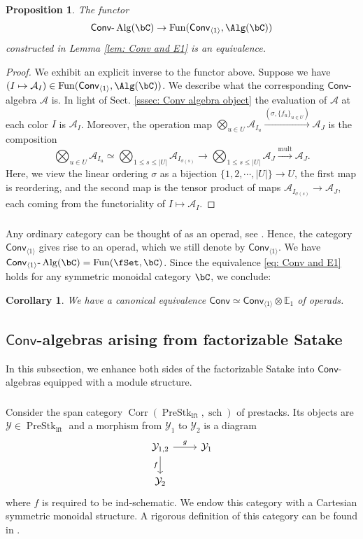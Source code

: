 \documentclass[10pt]{amsart}
\newcommand{\sssec}{\subsubsection}
\newtheorem{prop}[subsubsection]{Proposition}
\newtheorem{cor}[subsubsection]{Corollary}
\theoremstyle{remark}
\newcommand{\E}{\mathbb{E}}
\newcommand{\on}{\operatorname}
\newcommand{\cA}{\mathcal{A}}
\newcommand{\cY}{\mathcal{Y}}
\newcommand{\lAlg}{\text{-}\on{Alg}}
\newcommand{\PreStklft}{\on{PreStk}_{\on{lft}}}
\newcommand{\Fun}{\on{Fun}}
\newcommand{\Conv}{\mathsf{Conv}}
\newcommand{\Corr}{\on{Corr}}
\begin{document}
\begin{prop}
    The functor 
    \begin{equation}\label{eq: Conv and E1}
        \Conv\lAlg(\bC)\rightarrow \Fun(\Conv_{\langle 1\rangle},\Alg(\bC))
    \end{equation}
    constructed in Lemma \ref{lem: Conv and E1} is an equivalence.
\end{prop}
\begin{proof}
    We exhibit an explicit inverse to the functor above. Suppose we have $(I\mapsto\cA_I)\in \Fun(\Conv_{\langle 1\rangle},\Alg(\bC))$. We describe what the corresponding $\Conv$-algebra $\cA$ is. In light of Sect. \ref{sssec: Conv algebra object} the evaluation of $\cA$ at each color $I$ is $\cA_I$. Moreover, the operation map $\bigotimes_{u\in U}\cA_{I_u}\xrightarrow{(\sigma,\{f_u\}_{u\in U})}\cA_J$ is the composition
    \[\bigotimes_{u\in U}\cA_{I_u}\simeq \bigotimes_{1\le s\le |U|}\cA_{I_{\sigma(s)}}\rightarrow \bigotimes_{1\le s\le |U|}\cA_{J}\xrightarrow{\on{mult}}\cA_J.\]
    Here, we view the linear ordering $\sigma$ as a bijection $\{1,2,\cdots,|U|\}\rightarrow U$, the first map is reordering, and the second map is the tensor product of maps $\cA_{I_{\sigma(s)}}\rightarrow \cA_J$, each coming from the functoriality of $I\mapsto \cA_I$.
\end{proof}

\sssec{}
Any ordinary category can be thought of as an operad, see \cite[Remark 2.1.1.4]{HA}. Hence, the category $\Conv_{\langle 1\rangle}$ gives rise to an operad, which we still denote by $\Conv_{\langle 1\rangle}$. We have $\Conv_{\langle 1\rangle}\lAlg(\bC)=\Fun(\fSet,\bC)$. Since the equivalence \eqref{eq: Conv and E1} holds for any symmetric monoidal category $\bC$, we conclude:

\begin{cor}
    We have a canonical equivalence $\Conv\simeq \Conv_{\langle 1\rangle}\otimes \E_1$ of operads.
\end{cor}

\subsection{$\Conv$-algebras arising from factorizable Satake}\label{ssec: Conv algebras from fact Satake}
In this subsection, we enhance both sides of the factorizable Satake into $\Conv$-algebras equipped with a module structure.


\sssec{}\label{sssec: local Hecke Conv algebra in Stk}
Consider the span category $\Corr(\PreStklft, \on{sch})$ of prestacks. Its objects are $\cY\in\PreStklft$ and a morphism from $\cY_1$ to $\cY_2$ is a diagram
\begin{equation*}\label{eq: Corr diagram nontwisted}
    \begin{tikzcd}
	{\cY_{1,2}} & {\cY_1} \\
	{\cY_2}
	\arrow["g", from=1-1, to=1-2]
	\arrow["f"', from=1-1, to=2-1]
\end{tikzcd}
\end{equation*}
where $f$ is required to be ind-schematic. We endow this category with a Cartesian symmetric monoidal structure. A rigorous definition of this category can be found in \cite[Part III, Chapter 7, Sect. 1]{GR}.
\end{document}
